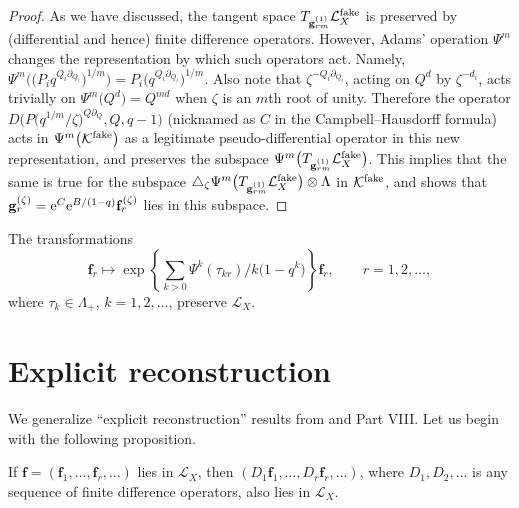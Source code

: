 \documentclass[pdftex]{sigma}
\def\D{\mathcal D}
\def\K{\mathcal K}
\def\L{\mathcal L}
\def\p{\partial}
\def\f{{\mathbf f}}
\def\g{{\mathbf g}}
\renewcommand{\Delta}{\triangle}
\begin{document}
\begin{proof}
As we have discussed, the tangent space $T_{\g_{rm}^{(1)}}\L_X^{\rm fake}$ is preserved by (differential and hence) finite difference operators. However, Adams' operation $\Psi^m$ changes the representation by which such operators act. Namely,
$\Psi^m \big(\big(P_iq^{Q_i\p_{Q_i}}\big)^{1/m}\big) = P_i \big(q^{Q_i\p_{Q_i}}\big)^{1/m}$. Also note that
$\zeta^{-Q_i\p_{Q_i}}$, ac\-ting on $Q^d$ by $\zeta^{-d_i}$, acts trivially on $\Psi^m\big(Q^d\big)=Q^{md}$ when $\zeta$ is an $m$th root of unity. Therefore the operator $D\big(P\big(q^{1/m}/\zeta\big)^{Q\p_Q},Q,q-1\big)$ (nicknamed as $C$ in the
Campbell--Hausdorff formula) acts in $\Psi^m\big(\K^{\rm fake}\big)$ as a legitimate pseudo-differential operator in this new representation, and preserves the subspace $\Psi^m\big(T_{\g_{rm}^{(1)}}\L_X^{\rm fake}\big)$. This implies that the same is true for the subspace $\Delta_{\zeta}\Psi^m\big(T_{\g_{rm}^{(1)}}\L_X^{\rm fake}\big) \otimes \Lambda$
in $\K^{\rm fake}$, and shows that $\g_r^{(\zeta)}={\rm e}^{C}{\rm e}^{B/(1-q)}\f_r^{(\zeta)}$ lies
in this subspace. \end{proof}

\begin{corollary}\label{Corollary1} The transformations
\[ \f_r \mapsto \exp\left\{ \sum_{k>0} \Psi^k(\tau_{kr})/k\big(1-q^k\big)\right\} \f_r,\qquad r=1,2,\dots, \]
where $\tau_k\in \Lambda_{+}$, $k=1,2,\dots$, preserve $\L_X$.
\end{corollary}

\section{Explicit reconstruction}\label{section4}

We generalize ``explicit reconstruction'' results from \cite{GiE} and Part VIII. Let us begin with the following proposition.

\begin{proposition}[$\D_q$-module structure]\label{Proposition1} If $\f=(\f_1,\dots,\f_r,\dots)$ lies in $\L_X$, then $(D_1\f_1, \dots, D_r\f_r,\allowbreak \dots)$, where $D_1,D_2,\dots$ is any sequence of finite difference operators, also lies in $\L_X$.
\end{proposition}
\end{document}
